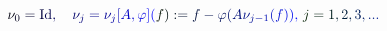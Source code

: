 \documentclass[12pt]{article}
\begin{document}
\makeatletter
\renewcommand*{\@textcolor}[3]{%
  \protect\leavevmode
  \begingroup
    \color#1{#2}#3%
  \endgroup
}
\makeatother
\begin{displaymath}
\mathcolor[RGB]{0,0,15}{\nu} _ { \mathcolor[RGB]{0,0,30}{0} } \mathcolor[RGB]{0,0,45}{=} \mathrm { \mathcolor[RGB]{0,0,60}{I} \mathcolor[RGB]{0,0,75}{d} } \mathcolor[RGB]{0,0,90}{,} \quad \mathcolor[RGB]{0,0,105}{\nu} _ { \mathcolor[RGB]{0,0,120}{j} } \mathcolor[RGB]{0,0,135}{=} \mathcolor[RGB]{0,0,150}{\nu} _ { \mathcolor[RGB]{0,0,165}{j} } \mathcolor[RGB]{0,0,180}{[} \mathcolor[RGB]{0,0,195}{A} \mathcolor[RGB]{0,0,210}{,} \mathcolor[RGB]{0,0,225}{\varphi} \mathcolor[RGB]{0,0,240}{]} \mathcolor[RGB]{0,0,255}{(} \mathcolor[RGB]{0,15,0}{f} \mathcolor[RGB]{0,15,15}{)} \mathcolor[RGB]{0,15,30}{:} \mathcolor[RGB]{0,15,45}{=} \mathcolor[RGB]{0,15,60}{f} \mathcolor[RGB]{0,15,75}{-} \mathcolor[RGB]{0,15,90}{\varphi} \mathcolor[RGB]{0,15,105}{(} \mathcolor[RGB]{0,15,120}{A} \mathcolor[RGB]{0,15,135}{\nu} _ { \mathcolor[RGB]{0,15,150}{j} \mathcolor[RGB]{0,15,165}{-} \mathcolor[RGB]{0,15,180}{1} } \mathcolor[RGB]{0,15,195}{(} \mathcolor[RGB]{0,15,210}{f} \mathcolor[RGB]{0,15,225}{)} \mathcolor[RGB]{0,15,240}{)} \mathcolor[RGB]{0,15,255}{,} \, \mathcolor[RGB]{0,30,0}{j} \mathcolor[RGB]{0,30,15}{=} \mathcolor[RGB]{0,30,30}{1} \mathcolor[RGB]{0,30,45}{,} \mathcolor[RGB]{0,30,60}{2} \mathcolor[RGB]{0,30,75}{,} \mathcolor[RGB]{0,30,90}{3} \mathcolor[RGB]{0,30,105}{,} \mathcolor[RGB]{0,30,120}{.} \mathcolor[RGB]{0,30,135}{.} \mathcolor[RGB]{0,30,150}{.}
\end{displaymath}
\end{document}
